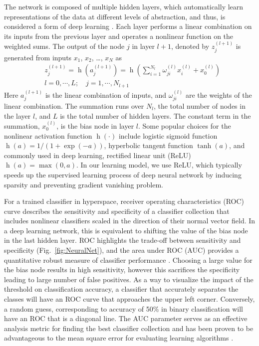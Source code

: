 \documentclass[aps,pra,reprint,longbibliography,superscriptaddress]{revtex4-1}
\DeclareMathOperator{\h}{h} %
\begin{document}
The network is composed of multiple hidden layers, which automatically learn representations of the data at different levels of abstraction, and thus, is considered a form of deep learning \cite{lecun2015deep, schmidhuber2015deep}. Each layer performs a linear combination on its inputs from the previous layer and operates a nonlinear function on the weighted sums. The output of the node $j$ in layer $l+1$, denoted by $z_j^{(l+1)}$ is generated from inputs $x_1$, $x_2$, \ldots, $x_N$ as
\begin{equation}
\begin{split}
& z_j^{(l+1)} = \h(a_j^{(l+1)}) = \h(\sum_{i=1}^{N_l} \omega_{ji}^{(l)} x_i^{(l)}+x_0^{(l)})\\
& l=0,\cdots,L;\quad j=1,\cdots,N_{l+1}
\end{split}
\end{equation}
Here $a_j^{(l+1)}$ is the linear combination of inputs, and $\omega_{ji}^{(l)}$ are the weights of the linear combination. The summation runs over $N_l$, the total number of nodes in the layer $l$, and $L$ is the total number of hidden layers. The constant term in the summation, $x_0^{(l)}$, is the bias node in layer $l$. Some popular choices for the nonlinear activation function $\h(\cdot)$ include logistic sigmoid function $\h(a)=1/(1+\exp(-a))$, hyperbolic tangent function $\tanh(a)$, and commonly used in deep learning, rectified linear unit (ReLU) $\h(a) = \max(0,a)$. In our learning model, we use ReLU, which typically speeds up the supervised learning process of deep neural network by inducing sparsity and preventing gradient vanishing problem. 

For a trained classifier in hyperspace, receiver operating characteristics (ROC) curve describes the sensitivity and specificity of a classifier collection that includes nonlinear classifiers scaled in the direction of their normal vector field. In a deep learning network, this is equivalent to shifting the value of the bias node in the last hidden layer. ROC highlights the trade-off between sensitivity and specificity (Fig.~\ref{fig:NeuralNet}), and the area under ROC (AUC) provides a quantitative robust measure of classifier performance \cite{hanley1982meaning, ling2003auc, cortes2004auc, liu2008roc}. Choosing a large value for the bias node results in high sensitivity, however this sacrifices the specificity leading to large number of false positives. As a way to visualize the impact of the threshold on classification accuracy, a classifier that accurately separates the classes will have an ROC curve that approaches the upper left corner. Conversely, a random guess, corresponding to accuracy of 50\% in binary classification will have an ROC that is a diagonal line. The AUC parameter serves as an effective analysis metric for finding the best classifier collection and has been proven to be advantageous to the mean square error for evaluating learning algorithms \cite{verrelst1998use}. 
\end{document}
